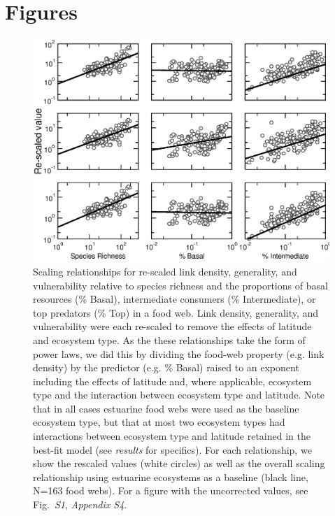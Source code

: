 \documentclass[12pt]{article}
\begin{document}
\section*{Figures}
\begin{figure}[h]
\centerline{\includegraphics*[width=.85\textwidth]{Figures/by_TL/scaling_with_S/proportions/fitlines_nonts.eps}}
\caption{Scaling relationships for re-scaled link density, generality, and vulnerability 
relative to species richness and the proportions of basal resources (\% Basal), intermediate 
consumers (\% Intermediate), or top predators (\% Top) in a food web. Link density, generality,
and vulnerability were each re-scaled to remove the effects of latitude and ecosystem
type. As the these relationships take the form of power laws, we did this by dividing the food-web
property (e.g. link density) by the predictor (e.g. \% Basal) raised to an exponent including the 
effects of latitude and, where applicable, ecosystem type and the interaction between ecosystem
type and latitude. Note that in all cases estuarine food webs were used as the baseline 
ecosystem type, but that at most two ecosystem types had interactions between ecosystem type and
latitude retained in the best-fit model (see \emph{results} for specifics). For each relationship, 
we show the rescaled values (white circles) as well as the overall scaling relationship using estuarine
ecosystems as a baseline (black line, N=163 food webs). For a figure with the uncorrected values,
see Fig.~\emph{S1}, \emph{Appendix S4}.}
\label{props_v_lat}
\end{figure}
\end{document}
